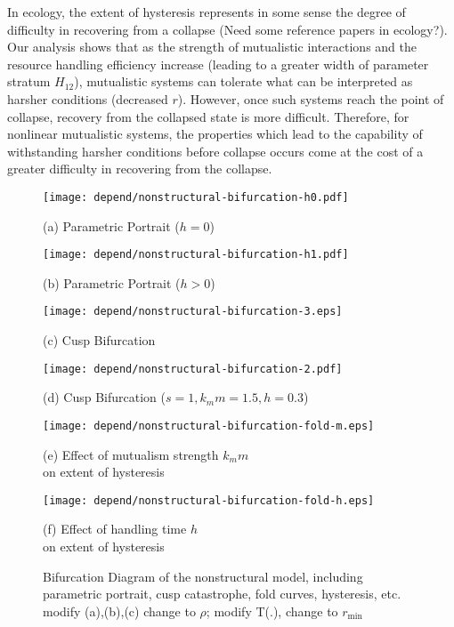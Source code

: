\documentclass[a4paper,fleqn,12pt]{article}
\begin{document}
In ecology, the extent of hysteresis represents in some sense the degree of difficulty in recovering from a collapse ({\color{red}Need some reference papers in ecology?}).
Our analysis shows that as the strength of mutualistic interactions and the resource handling efficiency increase (leading to a greater width of parameter stratum $H_{12}$), mutualistic systems can tolerate what can be interpreted as harsher conditions (decreased $r$). However, once such systems reach the point of collapse,
recovery from the collapsed state is more difficult.
Therefore, for nonlinear mutualistic systems, the properties which lead to the capability of withstanding harsher conditions before collapse occurs come at the cost of a greater difficulty in recovering from the collapse.


\begin{figure}[htbp]
\begin{minipage}{0.4\linewidth}
  \texttt{[image: depend/nonstructural-bifurcation-h0.pdf]}
  {\centering(a) Parametric Portrait ($h = 0$)\par}
\end{minipage}
\hfill
\begin{minipage}{0.4\linewidth}
  \texttt{[image: depend/nonstructural-bifurcation-h1.pdf]}
  {\centering(b) Parametric Portrait ($h > 0$)\par}
\end{minipage}
\begin{minipage}{0.45\linewidth}
  \texttt{[image: depend/nonstructural-bifurcation-3.eps]}
  {\centering(c) Cusp Bifurcation\par}
\end{minipage}
\hfill
\begin{minipage}{0.45\linewidth}
  \texttt{[image: depend/nonstructural-bifurcation-2.pdf]}
  {\centering (d) Cusp Bifurcation ($s = 1, k_mm = 1.5, h = 0.3$)\par}
\end{minipage}
\vfill
\begin{minipage}{0.45\linewidth}
  \texttt{[image: depend/nonstructural-bifurcation-fold-m.eps]}
  {\centering(e) Effect of mutualism strength $k_mm$ \\ on extent of hysteresis\par}
\end{minipage}
\hfill
\begin{minipage}{0.45\linewidth}
  \texttt{[image: depend/nonstructural-bifurcation-fold-h.eps]}
  {\centering(f) Effect of handling time $h$ \\ on extent of hysteresis\par}
\end{minipage}
\caption{Bifurcation Diagram of the nonstructural model, including parametric portrait, cusp catastrophe, fold curves, hysteresis, etc. {\color{red} modify (a),(b),(c) change to $\rho$; modify T(.), change to $r_{\mathrm{min}}$} }
\label{fig:nonstructural-bifurcation-diagram}
\end{figure}
\end{document}
